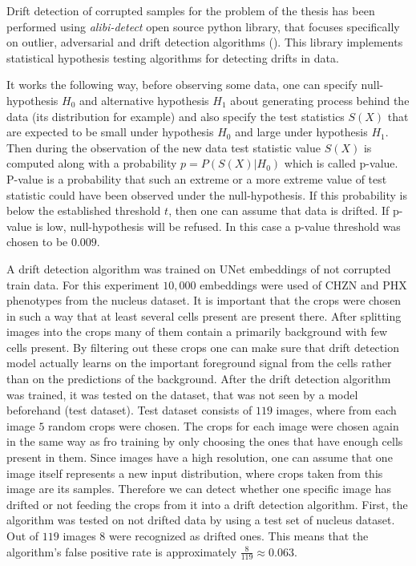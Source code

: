 Drift detection of corrupted samples for the problem of the thesis has been performed using \textit{alibi-detect} open source python library, that focuses specifically on outlier, adversarial and drift detection algorithms (\cite{alibi-detect}). This library implements statistical hypothesis testing algorithms for detecting drifts in data. 

It works the following way, before observing some data, one can specify null-hypothesis $H_0$ and alternative hypothesis $H_1$ about generating process behind the data (its distribution for example) and also specify the test statistics $S(X)$ that are expected to be small under hypothesis $H_0$ and large under hypothesis $H_1$. Then during the observation of the new data test statistic value $S(X)$ is computed along with a probability $p = P(S(X)|H_0)$ which is called p-value. P-value is a probability that such an extreme or a more extreme value of test statistic could have been observed under the null-hypothesis. If this probability is below the established threshold $t$, then one can assume that data is drifted. If p-value is low, null-hypothesis will be refused. In this case a p-value threshold was chosen to be $0.009$.

A drift detection algorithm was trained on UNet embeddings of not corrupted train data. For this experiment $10,000$ embeddings were used of CHZN and PHX phenotypes from the nucleus dataset. It is important that the crops were chosen in such a way that at least several cells present are present there. After splitting images into the crops many of them contain a primarily background with few cells present. By filtering out these crops one can make sure that drift detection model actually learns on the important foreground signal from the cells rather than on the predictions of the background. After the drift detection algorithm was trained, it was tested on the dataset, that was not seen by a model beforehand (test dataset). Test dataset consists of $119$ images, where from each image $5$ random crops were chosen. The crops for each image were chosen again in the same way as fro training by only choosing the ones that have enough cells present in them. Since images have a high resolution, one can assume that one image itself represents a new input distribution, where crops taken from this image are its samples. Therefore we can detect whether one specific image has drifted or not feeding the crops from it into a drift detection algorithm. First, the algorithm was tested on not drifted data by using a test set of nucleus dataset. Out of $119$ images $8$ were recognized as drifted ones. This means that the algorithm's false positive rate is approximately $\frac{8}{119} \approx 0.063$.

